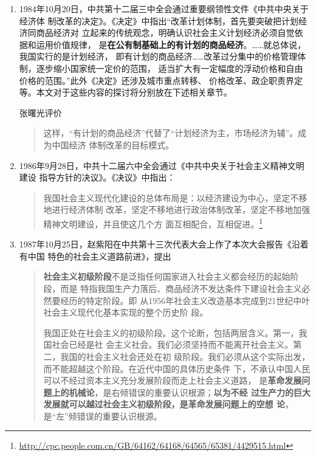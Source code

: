 \begin{enumerate}
\item 1984年10月20日，中共第十二届三中全会通过重要纲领性文件《中共中央关于经济体
  制改革的决定》。《决定》中指出“改革计划体制，首先要突破把计划经济同商品经济对
  立起来的传统观念，明确认识社会主义计划经济必须自觉依据和运用价值规律，
  是\textbf{在公有制基础上的有计划的商品经济}。……就总体说，我国实行的是计划经济，
  即有计划的商品经济……改革过分集中的价格管理体制，逐步缩小国家统一定价的范围，
  适当扩大有一定幅度的浮动价格和自由价格的范围。”此外《决定》还涉及城市重点转移、
  价格改革、政企职责界定等。本文对于这些内容的探讨将分别放在下述相关章节。

  张曙光评价
  \begin{quotation}
    这样，“有计划的商品经济”代替了“计划经济为主，市场经济为辅”。成为中国经济
    体制改革的目标模式。
  \end{quotation}

\item 1986年9月28日，中共十二届六中全会通过《中共中央关于社会主义精神文明建设
  指导方针的决议》。《决议》中指出：
  \begin{quotation}
    我国社会主义现代化建设的总体布局是：以经济建设为中心，坚定不移地进行经济体制
    改革，坚定不移地进行政治体制改革，坚定不移地加强精神文明建设，并且使这几个方
    面互相配合，互相促进。\footnote{\url{http://cpc.people.com.cn/GB/64162/64168/64565/65381/4429515.html}}
  \end{quotation}

\item 1987年10月25日，赵紫阳在中共第十三次代表大会上作了本次大会报告《沿着有中国
  特色的社会主义道路前进》，提出
  \begin{quotation}
    \textbf{社会主义初级阶段}不是泛指任何国家进入社会主义都会经历的起始阶段，而是
    特指我国生产力落后、商品经济不发达条件下建设社会主义必然要经历的特定阶段。即
    从1956年社会主义改造基本完成到21世纪中叶社会主义现代化基本实现的整个历史阶
    段。

    我国正处在社会主义的初级阶段。这个论断，包括两层含义。第一，我国社会已经是社
    会主义社会。我们必须坚持而不能离开社会主义。第二，我国的社会主义社会还处在初
    级阶段。我们必须从这个实际出发，而不能超越这个阶段。在近代中国的具体历史条件
    下，不承认中国人民可以不经过资本主义充分发展阶段而走上社会主义道路，
    是\textbf{革命发展问题上的机械论}，是右倾错误的重要认识根源；\textbf{以为不经
      过生产力的巨大发展就可以越过社会主义初级阶段，是革命发展问题上的空想
      论}，是“左”倾错误的重要认识根源。
  \end{quotation}


\end{enumerate}

